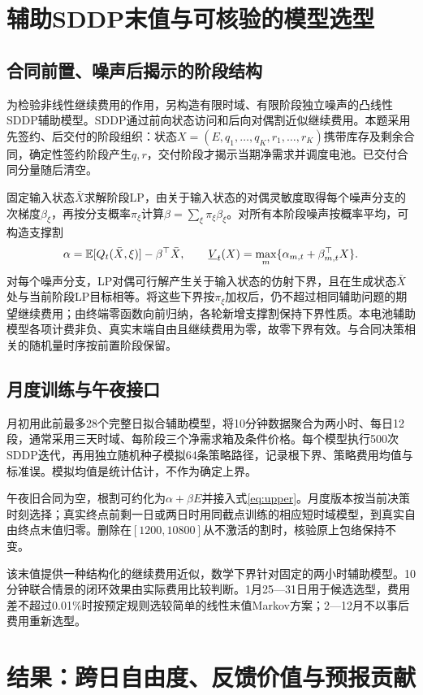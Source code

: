 \documentclass[UTF8,a4paper,zihao=-4,fontset=mac]{ctexart}
\begin{document}
\section{辅助SDDP末值与可核验的模型选型}
\subsection{合同前置、噪声后揭示的阶段结构}
为检验非线性继续费用的作用，另构造有限时域、有限阶段独立噪声的凸线性SDDP辅助模型。SDDP通过前向状态访问和后向对偶割近似继续费用\cite{sddp}。本题采用先签约、后交付的阶段组织：状态$X=(E,q_1,\ldots,q_K,r_1,\ldots,r_K)$携带库存及剩余合同，确定性签约阶段产生$q,r$，交付阶段才揭示当期净需求并调度电池。已交付合同分量随后清空。

固定输入状态$\bar X$求解阶段LP，由关于输入状态的对偶灵敏度取得每个噪声分支的次梯度$\beta_\xi$，再按分支概率$\pi_\xi$计算$\beta=\sum_\xi\pi_\xi\beta_\xi$。对所有本阶段噪声按概率平均，可构造支撑割
\begin{equation}
 \alpha=\mathbb E[Q_t(\bar X,\xi)]-\beta^\top\bar X,\qquad
 \underline V_t(X)=\max_m\{\alpha_{m,t}+\beta_{m,t}^\top X\}.
\end{equation}
对每个噪声分支，LP对偶可行解产生关于输入状态的仿射下界，且在生成状态$\bar X$处与当前阶段LP目标相等。将这些下界按$\pi_\xi$加权后，仍不超过相同辅助问题的期望继续费用；由终端零函数向前归纳，各轮新增支撑割保持下界性质。本电池辅助模型各项计费非负、真实末端自由且继续费用为零，故零下界有效。与合同决策相关的随机量时序按前置阶段保留。

\subsection{月度训练与午夜接口}
月初用此前最多28个完整日拟合辅助模型，将10分钟数据聚合为两小时、每日12段，通常采用三天时域、每阶段三个净需求箱及条件价格。每个模型执行500次SDDP迭代，再用独立随机种子模拟64条策略路径，记录根下界、策略费用均值与标准误。模拟均值是统计估计，不作为确定上界。

午夜旧合同为空，根割可约化为$\alpha+\beta E$并接入式\eqref{eq:upper}。月度版本按当前决策时刻选择；真实终点前剩一日或两日时用同截点训练的相应短时域模型，到真实自由终点末值归零。删除在$[1200,10800]$从不激活的割时，核验原上包络保持不变。

该末值提供一种结构化的继续费用近似，数学下界针对固定的两小时辅助模型。10分钟联合情景的闭环效果由实际费用比较判断。1月25—31日用于候选选型，费用差不超过0.01\%时按预定规则选较简单的线性末值Markov方案；2—12月不以事后费用重新选型。

\section{结果：跨日自由度、反馈价值与预报贡献}
\end{document}
